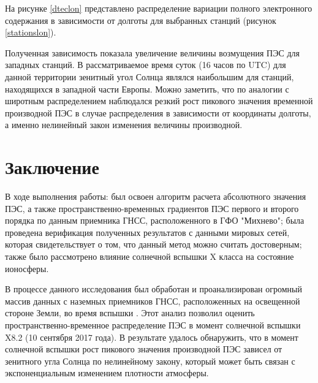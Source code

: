 \documentclass[a4paper]{article}
\begin{document}
На рисунке \ref{dteclon} представлено распределение вариации полного электронного содержания в зависимости от долготы для выбранных станций (рисунок \ref{stationslon}).

Полученная зависимость показала увеличение величины возмущения ПЭС для западных станций. В рассматриваемое время суток (16 часов по UTC) для данной территории  зенитный угол Солнца являлся наибольшим для станций, находящихся в западной части Европы. 
Можно заметить, что по аналогии с широтным распределением наблюдался резкий рост пикового значения временной производной ПЭС в случае распределения в зависимости от координаты долготы, а именно нелинейный закон изменения величины производной.




\clearpage
\newpage
\section{Заключение}
В ходе выполнения работы: был освоен алгоритм расчета абсолютного значения ПЭС, а также пространственно-временных градиентов ПЭС первого и второго порядка по данным приемника ГНСС, расположенного в ГФО "Михнево"; была проведена верификация полученных результатов с данными мировых сетей, которая свидетельствует о том, что данный метод можно считать достоверным; также было рассмотрено влияние солнечной вспышки X класса на состояние ионосферы. 

В процессе данного исследования был обработан и проанализирован огромный массив данных с наземных приемников ГНСС, расположенных на освещенной стороне Земли, во время вспышки . Этот анализ позволил оценить пространственно-временное распределение ПЭС в момент солнечной вспышки X8.2 (10 сентября 2017 года). В результате удалось обнаружить, что в момент солнечной вспышки рост пикового значения производной ПЭС зависел от зенитного угла Солнца по нелинейному закону, который может быть связан с экспоненциальным изменением плотности атмосферы. 
\end{document}
